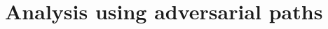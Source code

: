 \documentclass{ociamthesis}
\begin{document}

\section{Analysis using adversarial paths}
\end{document}
